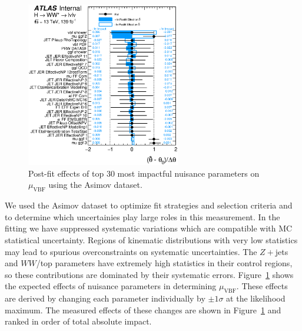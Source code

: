 \begin{figure}[!h]
\centering
      \includegraphics[width=0.6\textwidth]{Pictures/fitresults/impact_asimov_mu_vbf.eps}
\caption{Post-fit effects of top 30 most impactful nuisance parameters on $\mu_{\text{VBF}}$ using the Asimov dataset.}
\label{fig:impactsasimov}
\end{figure}

We used the Asimov dataset to optimize fit strategies and selection criteria and to determine which uncertainies play large roles in this measurement. In the fitting we have suppressed systematic variations which are compatible with MC statistical uncertainty.  Regions of kinematic distributions with very low statistics may lead to spurious overconstraints on systematic uncertainties. The $Z+$jets and $WW$/top parameters have extremely high statistics in their control regions, so these contributions are dominated by their systematic errors. Figure~\ref{fig:impactsasimov} shows the expected effects of nuisance parameters in determining $\mu_{\text{VBF}}$. These effects are derived by changing each parameter individually by $\pm 1\sigma$ at the likelihood maximum. The measured effects of these changes are shown in Figure~\ref{fig:impactsasimov} and ranked in order of total absolute impact. 

